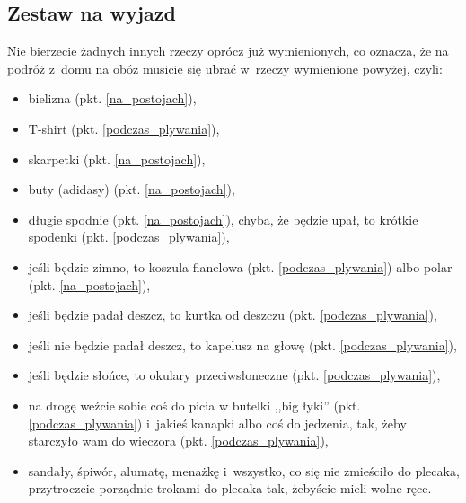 \subsection{Zestaw na wyjazd}
Nie bierzecie żadnych innych rzeczy oprócz już wymienionych, co oznacza, że na podróż z~domu na obóz musicie się ubrać w~rzeczy wymienione powyżej, czyli:
\begin{itemize}
\item bielizna (pkt. \ref{na_postojach}),
\item T-shirt (pkt. \ref{podczas_plywania}),
\item skarpetki (pkt. \ref{na_postojach}),
\item buty (adidasy) (pkt. \ref{na_postojach}),
\item długie spodnie (pkt. \ref{na_postojach}), chyba, że będzie upał, to krótkie spodenki (pkt. \ref{podczas_plywania}),
\item jeśli będzie zimno, to koszula flanelowa (pkt. \ref{podczas_plywania}) albo polar (pkt. \ref{na_postojach}),
\item jeśli będzie padał deszcz, to kurtka od deszczu (pkt. \ref{podczas_plywania}),
\item jeśli nie będzie padał deszcz, to kapelusz na głowę (pkt. \ref{podczas_plywania}),
\item jeśli będzie słońce, to okulary przeciwsłoneczne (pkt. \ref{podczas_plywania}),
\item na drogę weźcie sobie coś do picia w butelki ,,big łyki'' (pkt. \ref{podczas_plywania}) i~jakieś kanapki albo coś do jedzenia, tak, żeby starczyło wam do wieczora (pkt. \ref{podczas_plywania}),
\item sandały, śpiwór, alumatę, menażkę i~wszystko, co się nie zmieściło do plecaka, przytroczcie porządnie trokami do plecaka tak, żebyście mieli wolne ręce.
\end{itemize}